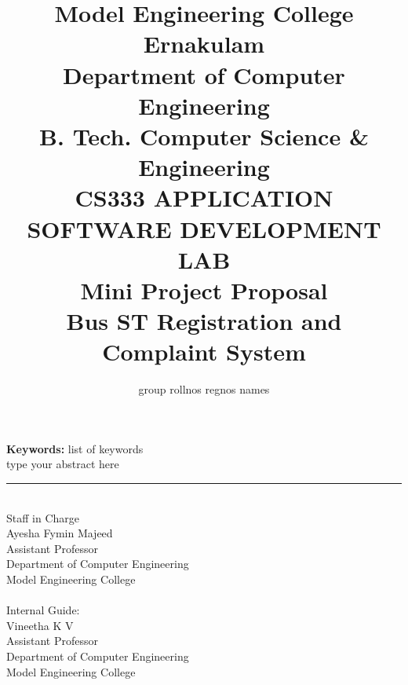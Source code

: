 \documentclass[twocolumn,10pt]{article}
\title{Model Engineering College Ernakulam
\\Department of Computer Engineering
\\B. Tech. Computer Science \& Engineering 
\\CS333 APPLICATION SOFTWARE DEVELOPMENT LAB           
\\ Mini Project Proposal
\\ Bus ST Registration and Complaint System
}
\author{  group rollnos regnos names  }
\begin{document}
\maketitle
	
{\bf Keywords:}
list of keywords\\
\abstract{} 
type your abstract here
\begin{thebibliography}{999}

\end{thebibliography}

\hrule
\vspace{.5in}

\\Staff in Charge \\
Ayesha Fymin Majeed \\
Assistant Professor \\
Department of Computer Engineering \\
Model Engineering College \\

\\Internal Guide:\\
Vineetha K V \\
Assistant Professor \\
Department of Computer Engineering \\
Model Engineering College \\
\end{document}

